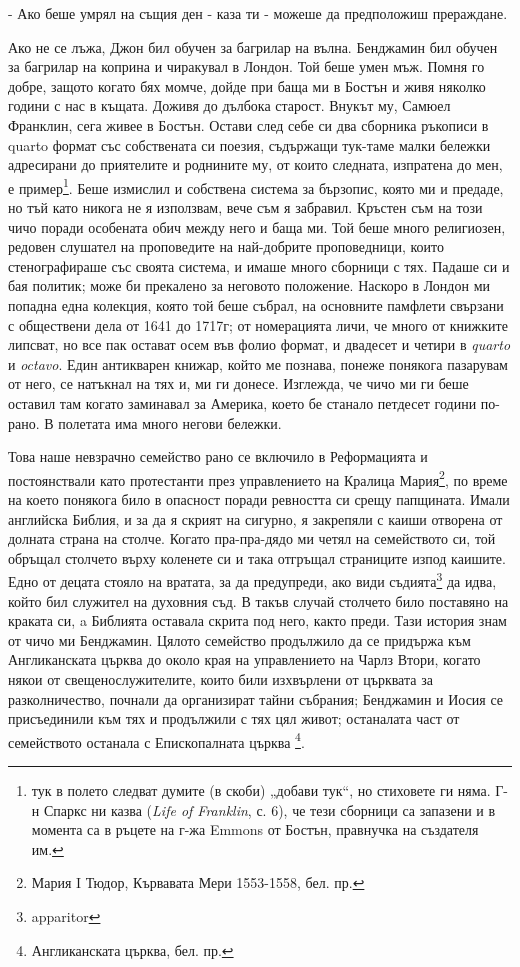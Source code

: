 \documentclass[12pt]{book}
\begin{document}
- Ако беше умрял на същия ден - каза ти - можеше да предположиш прераждане.

Ако не се лъжа, Джон бил обучен за багрилар на вълна. Бенджамин бил обучен за багрилар на коприна и чиракувал в Лондон. Той беше умен мъж. Помня го добре, защото когато бях момче, дойде при баща ми в Бостън и живя няколко години с нас в къщата. Доживя до дълбока старост. Внукът му, Самюел Франклин, сега живее в Бостън. Остави след себе си два сборника ръкописи в quarto формат със собствената си поезия, съдържащи тук-таме малки бележки адресирани до приятелите и роднините му, от които следната, изпратена до мен, е пример\footnote{ тук в полето следват думите (в скоби) „добави тук“, но стиховете ги няма. Г-н Спаркс ни казва (\textit{Life of Franklin}, с. 6), че тези сборници са запазени и в момента са в ръцете на г-жа Emmons от Бостън, правнучка на създателя им.}. Беше измислил и собствена система за бързопис, която ми и предаде, но тъй като никога не я използвам, вече съм я забравил. Кръстен съм на този чичо поради особената обич между него и баща ми. Той беше много религиозен, редовен слушател на проповедите на най-добрите проповедници, които стенографираше със своята система, и имаше много сборници с тях. Падаше си и бая политик; може би прекалено за неговото положение. Наскоро в Лондон ми попадна една колекция, която той беше събрал, на основните памфлети свързани с обществени дела от 1641 до 1717г; от номерацията личи, че много от книжките липсват, но все пак остават осем във фолио формат, и двадесет и четири в \textit{quarto} и \textit{octavo}. Един антикварен книжар, който ме познава, понеже понякога пазарувам от него, се натъкнал на тях и, ми ги донесе. Изглежда, че чичо ми ги беше оставил там когато заминавал за Америка, което бе станало петдесет години по-рано. В полетата има много негови бележки.

Това наше невзрачно семейство рано се включило в Реформацията и постоянствали като протестанти през управлението на Кралица Мария\footnote{Мария I Тюдор, Кървавата Мери 1553-1558, бел. пр.}, по време на което понякога било в опасност поради ревността си срещу папщината. Имали английска Библия, и за да я скрият на сигурно, я закрепяли с каиши отворена от долната страна на столче. Когато пра-пра-дядо ми четял на семейството си, той обръщал столчето върху коленете си и така отгръщал страниците изпод каишите. Едно от децата стояло на вратата, за да предупреди, ако види съдията\footnote{apparitor} да идва, който бил служител на духовния съд. В такъв случай столчето било поставяно на краката си, a Библията оставала скрита под него, както преди. Тази история знам от чичо ми Бенджамин. Цялото семейство продължило да се придържа към Англиканската църква до около края на управлението на Чарлз Втори, когато някои от свещенослужителите, които били изхвърлени от църквата за разколничество, почнали да организират тайни събрания; Бенджамин и Иосия се присъединили към тях и продължили с тях цял живот; останалата част от семейството останала с Епископалната църква \footnote{Англиканската църква, бел. пр.}. 
\end{document}
